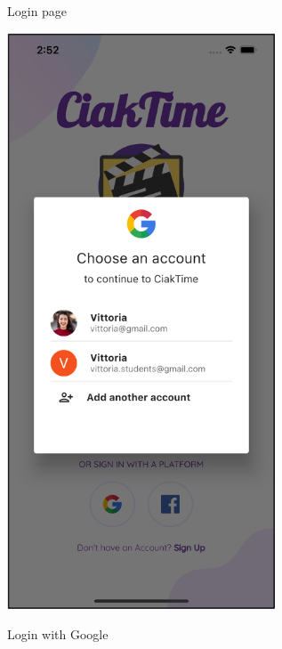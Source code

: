 \documentclass[12pt, a4paper]{article}
\numberwithin{figure}{section}
\begin{document}
\begin{center}
\begin{minipage}[t]{0.31\textwidth}
\begin{figure}[H]
			\caption{Login page}
		\end{figure}
	\end{minipage}
	\hspace{0.015\linewidth}
	\begin{minipage}[t]{0.31\textwidth}
		\begin{figure}[H]
			\centering
			\includegraphics[width=0.71\textwidth]{images/prototype2/loginGoogle.png}\\
			\caption{Login with Google}
		\end{figure}
	\end{minipage}
	\hspace{0.015\linewidth}
	\begin{minipage}[t]{0.32\textwidth}
		\begin{figure}[H]

\end{figure}
\end{minipage}
\end{center}
\end{document}
